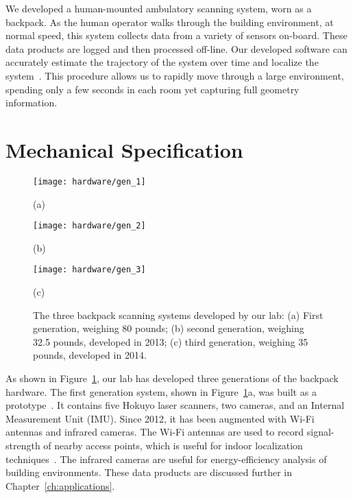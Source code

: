 \documentclass[12pt,onecolumn,oneside]{book}
\begin{document}
We developed a human-mounted ambulatory scanning system, worn as a backpack.  As the human operator walks through the building environment, at normal speed, this system collects data from a variety of sensors on-board.  These data products are logged and then processed off-line.  Our developed software can accurately estimate the trajectory of the system over time and localize the system~\cite{NickJournal}.  This procedure allows us to rapidly move through a large environment, spending only a few seconds in each room yet capturing full geometry information.

\section{Mechanical Specification}
\label{sec:mechanical}

\begin{figure}

	\centering
	\begin{minipage}[c]{0.32\linewidth}
		\centerline{\texttt{[image: hardware/gen\_1]}}
		\centerline{(a)}\medskip
	\end{minipage}
	\hfill
	\begin{minipage}[c]{0.32\linewidth}
		\centerline{\texttt{[image: hardware/gen\_2]}}
		\centerline{(b)}\medskip
	\end{minipage}
	\hfill
	\begin{minipage}[c]{0.32\linewidth}
		\centerline{\texttt{[image: hardware/gen\_3]}}
		\centerline{(c)}\medskip
	\end{minipage}	

	\caption[The three backpack scanning systems developed by our lab.]{The three backpack scanning systems developed by our lab:  (a) First generation, weighing 80 pounds; (b) second generation, weighing 32.5 pounds, developed in 2013; (c) third generation, weighing 35 pounds, developed in 2014.}
	\label{fig:all_backpacks}

\end{figure}

As shown in Figure~\ref{fig:all_backpacks}, our lab has developed three generations of the backpack hardware.  The first generation system, shown in Figure~\ref{fig:all_backpacks}a, was built as a prototype~\cite{Backpack}.  It contains five Hokuyo laser scanners, two cameras, and an Internal Measurement Unit (IMU).  Since 2012, it has been augmented with Wi-Fi antennas and infrared cameras.  The Wi-Fi antennas are used to record signal-strength of nearby access points, which is useful for indoor localization techniques~\cite{Levchev14}.  The infrared cameras are useful for energy-efficiency analysis of building environments.  These data products are discussed further in Chapter~\ref{ch:applications}.
\end{document}
